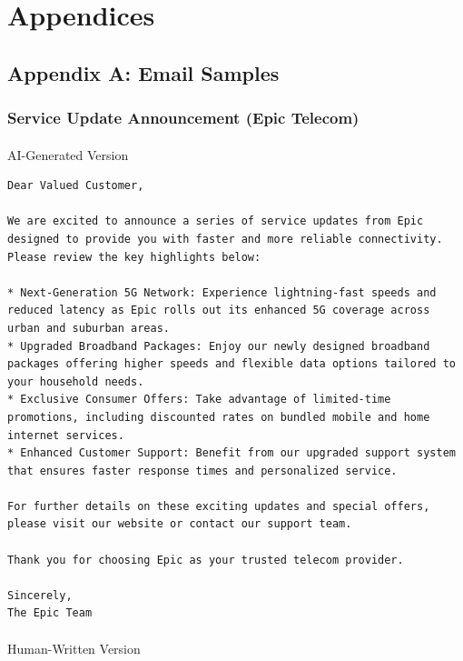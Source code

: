 \documentclass[
]{article}
\makeatletter
\let\oldparagraph\paragraph
\renewcommand{\paragraph}{
    \@ifstar
      \xxxParagraphStar
      \xxxParagraphNoStar
  }
\newcommand{\xxxParagraphStar}[1]{\oldparagraph*{#1}\mbox{}}
\newcommand{\xxxParagraphNoStar}[1]{\oldparagraph{#1}\mbox{}}
\makeatother
\begin{document}
\section{Appendices}\label{appendices}

\subsection{Appendix A: Email Samples}\label{appendix-a-email-samples}

\subsubsection{Service Update Announcement (Epic
Telecom)}\label{service-update-announcement-epic-telecom}

\paragraph{AI-Generated Version}\label{ai-generated-version}

\begin{verbatim}
Dear Valued Customer,

We are excited to announce a series of service updates from Epic designed to provide you with faster and more reliable connectivity. Please review the key highlights below:

* Next-Generation 5G Network: Experience lightning-fast speeds and reduced latency as Epic rolls out its enhanced 5G coverage across urban and suburban areas.
* Upgraded Broadband Packages: Enjoy our newly designed broadband packages offering higher speeds and flexible data options tailored to your household needs.
* Exclusive Consumer Offers: Take advantage of limited-time promotions, including discounted rates on bundled mobile and home internet services.
* Enhanced Customer Support: Benefit from our upgraded support system that ensures faster response times and personalized service.

For further details on these exciting updates and special offers, please visit our website or contact our support team.

Thank you for choosing Epic as your trusted telecom provider.

Sincerely,
The Epic Team
\end{verbatim}

\paragraph{Human-Written Version}\label{human-written-version}
\end{document}
